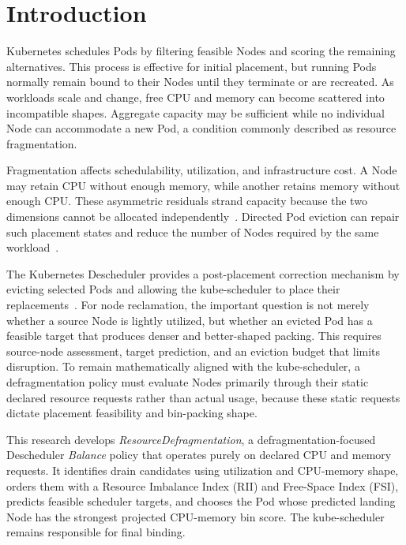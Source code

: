 \section{Introduction}
\label{bab:1}

Kubernetes schedules Pods by filtering feasible Nodes and scoring the remaining alternatives. This process is effective for initial placement, but running Pods normally remain bound to their Nodes until they terminate or are recreated. As workloads scale and change, free CPU and memory can become scattered into incompatible shapes. Aggregate capacity may be sufficient while no individual Node can accommodate a new Pod, a condition commonly described as resource fragmentation.

Fragmentation affects schedulability, utilization, and infrastructure cost. A Node may retain CPU without enough memory, while another retains memory without enough CPU. These asymmetric residuals strand capacity because the two dimensions cannot be allocated independently~\cite{xiao2013dynamic,guo2025joint}. Directed Pod eviction can repair such placement states and reduce the number of Nodes required by the same workload~\cite{larsson_klein_elmroth_2023}.

The Kubernetes Descheduler provides a post-placement correction mechanism by evicting selected Pods and allowing the kube-scheduler to place their replacements~\cite{k8s_descheduler_docs}. For node reclamation, the important question is not merely whether a source Node is lightly utilized, but whether an evicted Pod has a feasible target that produces denser and better-shaped packing. This requires source-node assessment, target prediction, and an eviction budget that limits disruption. To remain mathematically aligned with the kube-scheduler, a defragmentation policy must evaluate Nodes primarily through their static declared resource requests rather than actual usage, because these static requests dictate placement feasibility and bin-packing shape.

This research develops \textit{ResourceDefragmentation}, a defragmentation-focused Descheduler \textit{Balance} policy that operates purely on declared CPU and memory requests. It identifies drain candidates using utilization and CPU-memory shape, orders them with a Resource Imbalance Index (RII) and Free-Space Index (FSI), predicts feasible scheduler targets, and chooses the Pod whose predicted landing Node has the strongest projected CPU-memory bin score. The kube-scheduler remains responsible for final binding.

